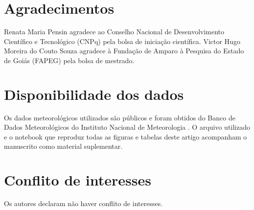 
\section*{Agradecimentos}
Renata Maria Pensin agradece ao Conselho Nacional de Desenvolvimento Científico e Tecnológico (CNPq) pela bolsa de iniciação científica. Victor Hugo Moreira do Couto Souza agradece à Fundação de Amparo à Pesquisa do Estado de Goiás (FAPEG) pela bolsa de mestrado.

\section*{Disponibilidade dos dados}
Os dados meteorológicos utilizados são públicos e foram obtidos do Banco de Dados Meteorológicos do Instituto Nacional de Meteorologia \parencite{inmet2025}. O arquivo utilizado e o notebook que reproduz todas as figuras e tabelas deste artigo acompanham o manuscrito como material suplementar.

\section*{Conflito de interesses}
Os autores declaram não haver conflito de interesses.
